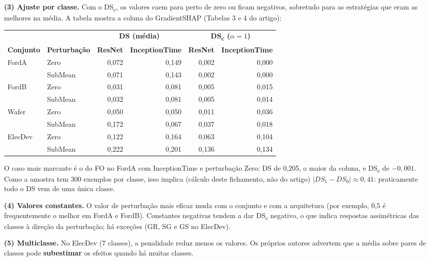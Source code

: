 \documentclass[11pt,a4paper]{article}
\begin{document}
\textbf{(3) Ajuste por classe.} Com o DS\textsubscript{c}, os valores caem para perto de zero ou ficam negativos, sobretudo para as estratégias que eram as melhores na média. A tabela mostra a coluna do GradientSHAP (Tabelas 3 e 4 do artigo):
\begin{center}\small
\begin{tabular}{llrrrr}
\toprule
& & \multicolumn{2}{c}{\textbf{DS (média)}} & \multicolumn{2}{c}{\textbf{DS\textsubscript{c} ($α=1$)}} \\
\cmidrule(lr){3-4}\cmidrule(lr){5-6}
\textbf{Conjunto} & \textbf{Perturbação} & \textbf{ResNet} & \textbf{InceptionTime} & \textbf{ResNet} & \textbf{InceptionTime} \\
\midrule
FordA   & Zero    & 0,072 & 0,149 & 0,002 & 0,000 \\
        & SubMean & 0,071 & 0,143 & 0,002 & 0,000 \\
FordB   & Zero    & 0,031 & 0,081 & 0,005 & 0,015 \\
        & SubMean & 0,032 & 0,081 & 0,005 & 0,014 \\
Wafer   & Zero    & 0,050 & 0,050 & 0,011 & 0,036 \\
        & SubMean & 0,172 & 0,067 & 0,037 & 0,018 \\
ElecDev & Zero    & 0,122 & 0,164 & 0,063 & 0,104 \\
        & SubMean & 0,222 & 0,201 & 0,136 & 0,134 \\
\bottomrule
\end{tabular}
\end{center}
O caso mais marcante é o do FO no FordA com InceptionTime e perturbação Zero: DS de 0,205, o maior da coluna, e DS\textsubscript{c} de $-0{,}001$. Como a amostra tem 300 exemplos por classe, isso implica (cálculo deste fichamento, não do artigo) $\lvert DS_1 - DS_0\rvert \approx 0{,}41$: praticamente todo o DS vem de uma única classe.

\textbf{(4) Valores constantes.} O valor de perturbação mais eficaz muda com o conjunto e com a arquitetura (por exemplo, 0,5 é frequentemente o melhor em FordA e FordB). Constantes negativas tendem a dar DS\textsubscript{c} negativo, o que indica respostas assimétricas das classes à direção da perturbação; há exceções (GR, SG e GS no ElecDev).

\textbf{(5) Multiclasse.} No ElecDev (7 classes), a penalidade reduz menos os valores. Os próprios autores advertem que a média sobre pares de classes pode \textbf{subestimar} os efeitos quando há muitas classes.
\end{document}
